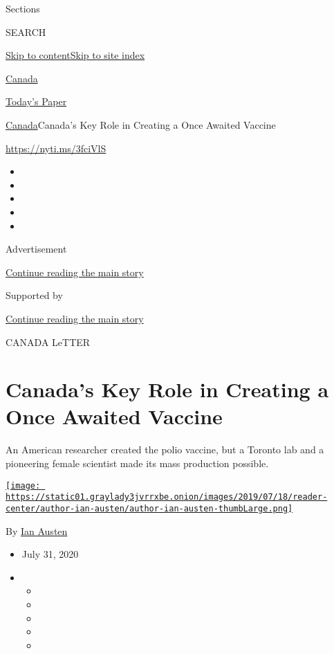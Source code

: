 Sections

SEARCH

\protect\hyperlink{site-content}{Skip to
content}\protect\hyperlink{site-index}{Skip to site index}

\href{https://www.nytimes3xbfgragh.onion/section/world/canada}{Canada}

\href{https://myaccount.nytimes3xbfgragh.onion/auth/login?response_type=cookie\&client_id=vi}{}

\href{https://www.nytimes3xbfgragh.onion/section/todayspaper}{Today's
Paper}

\href{/section/world/canada}{Canada}\textbar{}Canada's Key Role in
Creating a Once Awaited Vaccine

\url{https://nyti.ms/3fciVlS}

\begin{itemize}
\item
\item
\item
\item
\item
\end{itemize}

Advertisement

\protect\hyperlink{after-top}{Continue reading the main story}

Supported by

\protect\hyperlink{after-sponsor}{Continue reading the main story}

CANADA LeTTER

\hypertarget{canadas-key-role-in-creating-a-once-awaited-vaccine}{%
\section{Canada's Key Role in Creating a Once Awaited
Vaccine}\label{canadas-key-role-in-creating-a-once-awaited-vaccine}}

An American researcher created the polio vaccine, but a Toronto lab and
a pioneering female scientist made its mass production possible.

\href{https://www.nytimes3xbfgragh.onion/by/ian-austen}{\texttt{[image: https://static01.graylady3jvrrxbe.onion/images/2019/07/18/reader-center/author-ian-austen/author-ian-austen-thumbLarge.png]}}

By \href{https://www.nytimes3xbfgragh.onion/by/ian-austen}{Ian Austen}

\begin{itemize}
\item
  July 31, 2020
\item
  \begin{itemize}
  \item
  \item
  \item
  \item
  \item
  \end{itemize}
\end{itemize}

